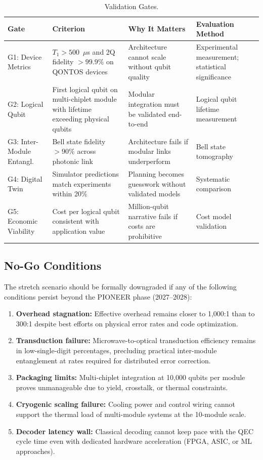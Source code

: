 \documentclass[conference]{IEEEtran}
\begin{document}
\begin{table}[htbp]
\centering
\caption{Validation Gates.}
\label{tab:gates}
\begin{tabular}{lp{4cm}p{3.5cm}p{4cm}}
\toprule
\textbf{Gate} & \textbf{Criterion} & \textbf{Why It Matters} & \textbf{Evaluation Method} \\
\midrule
G1: Device Metrics & $T_1 > 500$~$\mu$s and 2Q fidelity $> 99.9\%$ on QONTOS devices & Architecture cannot scale without qubit quality & Experimental measurement; statistical significance \\
G2: Logical Qubit & First logical qubit on multi-chiplet module with lifetime exceeding physical qubits & Modular integration must be validated end-to-end & Logical qubit lifetime measurement \\
G3: Inter-Module Entangl. & Bell state fidelity $> 90\%$ across photonic link & Architecture fails if modular links underperform & Bell state tomography \\
G4: Digital Twin & Simulator predictions match experiments within 20\% & Planning becomes guesswork without validated models & Systematic comparison \\
G5: Economic Viability & Cost per logical qubit consistent with application value & Million-qubit narrative fails if costs are prohibitive & Cost model validation \\
\bottomrule
\end{tabular}
\end{table}

\subsection{No-Go Conditions}

The stretch scenario should be formally downgraded if any of the following conditions persist beyond the PIONEER phase (2027--2028):

\begin{enumerate}
\item \textbf{Overhead stagnation:} Effective overhead remains closer to 1,000:1 than to 300:1 despite best efforts on physical error rates and code optimization.
\item \textbf{Transduction failure:} Microwave-to-optical transduction efficiency remains in low-single-digit percentages, precluding practical inter-module entanglement at rates required for distributed error correction.
\item \textbf{Packaging limits:} Multi-chiplet integration at 10,000 qubits per module proves unmanageable due to yield, crosstalk, or thermal constraints.
\item \textbf{Cryogenic scaling failure:} Cooling power and control wiring cannot support the thermal load of multi-module systems at the 10-module scale.
\item \textbf{Decoder latency wall:} Classical decoding cannot keep pace with the QEC cycle time even with dedicated hardware acceleration (FPGA, ASIC, or ML approaches).
\end{enumerate}
\end{document}
